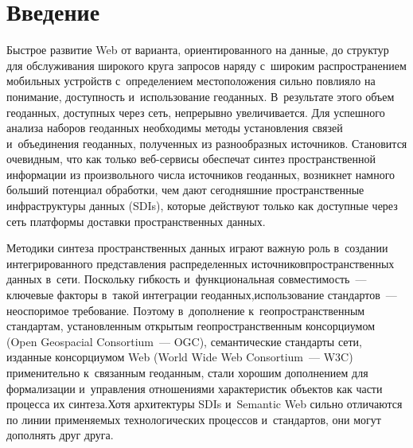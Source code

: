   



\thispagestyle{headings}

\begin{multicols}{2}

\label{st\stat}

\section{Введение}

     
     Быстрое развитие Web от варианта, ориентированного на данные, до 
структур для обслуживания широкого круга запросов наряду с~широким 
распространением мобильных устройств с~определением местоположения 
сильно повлияло на понимание, доступность и~использование геоданных. 
В~результате этого объем геоданных, доступных через сеть, непрерывно 
увеличивается. Для успешного анализа наборов геоданных необходимы методы 
установления связей и~объединения геоданных, полученных из разнообразных 
источников. Становится очевидным, что как только веб-сер\-ви\-сы обеспечат 
синтез пространственной информации из произвольного числа источников 
геоданных, возникнет намного больший потенциал обработки, чем дают 
сегодняшние пространственные инфраструктуры данных (SDIs), которые действуют только как доступные через сеть 
платформы доставки пространственных данных. 

Методики синтеза 
пространственных данных играют важную роль в~создании интегрированного 
представления распределенных источников\linebreak пространственных данных в~сети. 
Поскольку гибкость и~функциональная совместимость~--- клю\-чевые факторы 
в~такой интеграции геоданных,\linebreak использование стандартов~--- неоспоримое 
требование. Поэтому в~дополнение к~геопространственным стандартам, 
установленным открытым геопространственным консорциумом (Open 
Geospacial Consortium~--- OGC), семантические стандарты сети, изданные 
консорциумом Web (World Wide Web Consortium~--- W3C) применительно 
к~связанным геоданным, стали хорошим дополнением для формализации 
и~управления отношениями ха\-рак\-те\-ристик объектов как части процесса их 
синтеза.\linebreak Хотя архитектуры SDIs и~Semantic Web сильно отличаются по линии 
применяемых технологических процессов и~стандартов, они могут дополнять 
друг друга.
     

\end{multicols}
